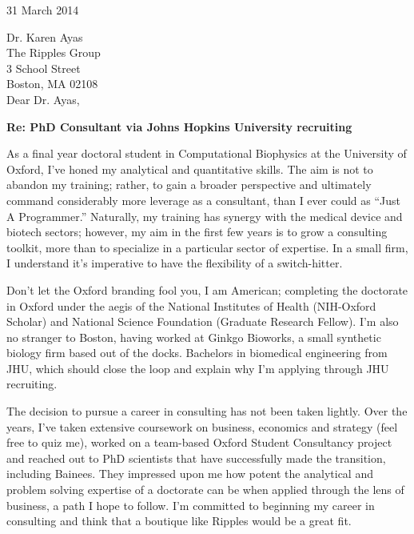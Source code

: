 \documentclass[a4paper]{../res}
\begin{document}
 
\begin{sloppypar}
 
%


\begin{resume} 
 
31 March 2014

Dr. Karen Ayas \\
The Ripples Group \\
3 School Street \\
Boston, MA 02108 \\

Dear Dr. Ayas, %

\textbf{Re: PhD Consultant via Johns Hopkins University recruiting}

As a final year doctoral student in Computational Biophysics at the University of Oxford, I've honed my analytical and quantitative skills. The aim is not to abandon my training; rather, to gain a broader perspective and ultimately command considerably more leverage as a consultant, than I ever could as ``Just A Programmer.'' Naturally, my training has synergy with the medical device and biotech sectors; however, my aim in the first few years is to grow a consulting toolkit, more than to specialize in a particular sector of expertise. In a small firm, I understand it's imperative to have the flexibility of a switch-hitter.

Don't let the Oxford branding fool you, I am American; completing the doctorate in Oxford under the aegis of the National Institutes of Health (NIH-Oxford Scholar) and National Science Foundation (Graduate Research Fellow). I'm also no stranger to Boston, having worked at Ginkgo Bioworks, a small synthetic biology firm based out of the docks. Bachelors in biomedical engineering from JHU, which should close the loop and explain why I'm applying through JHU recruiting. 

The decision to pursue a career in consulting has not been taken lightly. Over the years, I've taken extensive coursework on business, economics and strategy (feel free to quiz me), worked on a team-based Oxford Student Consultancy project and reached out to PhD scientists that have successfully made the transition, including Bainees. They impressed upon me how potent the analytical and problem solving expertise of a doctorate can be when applied through the lens of business, a path I hope to follow. I'm committed to beginning my career in consulting and think that a boutique like Ripples would be a great fit.


\end{resume}
\end{sloppypar}
\end{document}
